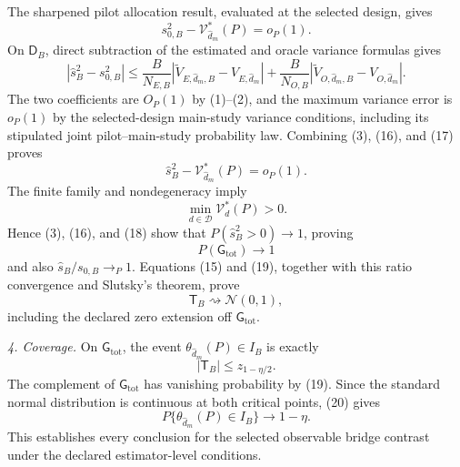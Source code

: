 The sharpened pilot allocation result, evaluated at the selected design, gives
\[
 s_{0,B}^2-\mathcal V_{\widehat d_m}^*(P)=o_P(1). \tag{16}
\]
On \(\mathsf D_B\), direct subtraction of the estimated and oracle variance formulas gives
\[
 |\widehat s_B^2-s_{0,B}^2|
 \le \frac{B}{N_{E,B}}
 |\widetilde V_{E,\widehat d_m,B}-V_{E,\widehat d_m}|
 +\frac{B}{N_{O,B}}
 |\widetilde V_{O,\widehat d_m,B}-V_{O,\widehat d_m}|. \tag{17}
\]
The two coefficients are \(O_P(1)\) by (1)--(2), and the maximum variance error is \(o_P(1)\) by the selected-design main-study variance conditions, including its stipulated joint pilot--main-study probability law.  Combining (3), (16), and (17) proves
\[
 \widehat s_B^2-\mathcal V_{\widehat d_m}^*(P)=o_P(1). \tag{18}
\]
The finite family and nondegeneracy imply
\[
 \min_{d\in\mathcal D}\mathcal V_d^*(P)>0.
\]
Hence (3), (16), and (18) show that \(P(\widehat s_B^2>0)\to1\), proving
\[
 P(\mathsf G_{\mathrm{tot}})\longrightarrow1 \tag{19}
\]
and also \(\widehat s_B/s_{0,B}\to_P1\).  Equations (15) and (19), together with this ratio convergence and Slutsky's theorem, prove
\[
 \mathsf T_B\rightsquigarrow\mathcal N(0,1), \tag{20}
\]
including the declared zero extension off \(\mathsf G_{\mathrm{tot}}\).

\emph{4. Coverage.}
On \(\mathsf G_{\mathrm{tot}}\), the event \(\theta_{\widehat d_m}(P)\in I_B\) is exactly
\[
 |\mathsf T_B|\le z_{1-\eta/2}.
\]
The complement of \(\mathsf G_{\mathrm{tot}}\) has vanishing probability by (19).  Since the standard normal distribution is continuous at both critical points, (20) gives
\[
 P\{\theta_{\widehat d_m}(P)\in I_B\}\longrightarrow1-\eta.
\]
This establishes every conclusion for the selected observable bridge contrast under the declared estimator-level conditions.